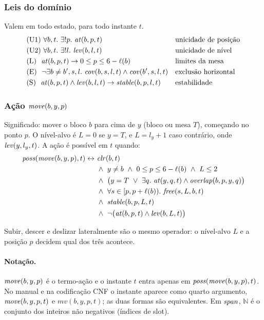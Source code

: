 \subsubsection{Leis do domínio}
Valem em todo estado, para todo instante $t$.
\begin{align*}
&\text{(U1)}\ \forall b,t.\ \exists! p.\ \At(b,p,t) &&\text{unicidade de posição}\\
&\text{(U2)}\ \forall b,t.\ \exists! l.\ \Lev(b,l,t) &&\text{unicidade de nível}\\
&\text{(L)}\ \ \At(b,p,t)\rightarrow 0\le p\le 6-\ell(b) &&\text{limites da mesa}\\
&\text{(E)}\ \ \neg\exists b\neq b',s,l.\ \Cov(b,s,l,t)\land\Cov(b',s,l,t) &&\text{exclusão horizontal}\\
&\text{(S)}\ \ \At(b,p,t)\land\Lev(b,l,t)\rightarrow\Stable(b,p,l,t) &&\text{estabilidade}
\end{align*}

\subsubsection{Ação $\mathit{move}(b,y,p)$}
Significado: mover o bloco $b$ para cima de $y$ (bloco ou mesa $T$), começando no ponto $p$.
O nível-alvo é $L=0$ se $y=T$, e $L=l_y+1$ caso contrário, onde $\mathit{lev}(y,l_y,t)$. A ação é possível em $t$ quando:
\begin{align*}
\Poss(\Move(b,y,p),t)\leftrightarrow\ &\Clr(b,t)\\
&\land\ y\neq b\ \land\ 0\le p\le 6-\ell(b)\ \land\ L\le 2\\
&\land\ \bigl(y=T\ \lor\ \exists q.\ \At(y,q,t)\land\Overlap(b,p,y,q)\bigr)\\
&\land\ \forall s\in[p,p+\ell(b)).\ \Free(s,L,b,t)\\
&\land\ \Stable(b,p,L,t)\\
&\land\ \neg\bigl(\At(b,p,t)\land\Lev(b,L,t)\bigr)
\end{align*}

Subir, descer e deslizar lateralmente são o mesmo operador: o nível-alvo $L$ e a posição $p$ decidem qual dos três acontece.

\paragraph{Notação.}
$\mathit{move}(b,y,p)$ é o termo-ação e o instante $t$ entra apenas em $\mathit{poss}(\mathit{move}(b,y,p),t)$. No manual e na codificação CNF o instante aparece como quarto argumento, $\mathit{move}(b,y,p,t)$ e $\mathit{mv}(b,y,p,t)$; as duas formas são equivalentes. Em $\mathit{span}$, $\mathbb{N}$ é o conjunto dos inteiros não negativos (índices de slot).

